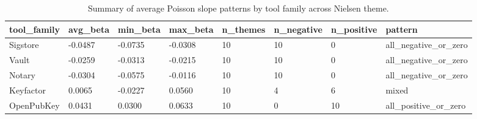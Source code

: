 \begin{table}[t]
\centering
\caption{Summary of average Poisson slope patterns by tool family across Nielsen theme.}
\label{tab:poisson-avg-beta-tool-nielsen-theme-summary}
\scriptsize
\begin{tabular}{llllllll}
\hline
tool\_family & avg\_beta & min\_beta & max\_beta & n\_themes & n\_negative & n\_positive & pattern \\
\hline
Sigstore & -0.0487 & -0.0735 & -0.0308 & 10 & 10 & 0 & all\_negative\_or\_zero \\
Vault & -0.0259 & -0.0313 & -0.0215 & 10 & 10 & 0 & all\_negative\_or\_zero \\
Notary & -0.0304 & -0.0575 & -0.0116 & 10 & 10 & 0 & all\_negative\_or\_zero \\
Keyfactor & 0.0065 & -0.0227 & 0.0560 & 10 & 4 & 6 & mixed \\
OpenPubKey & 0.0431 & 0.0300 & 0.0633 & 10 & 0 & 10 & all\_positive\_or\_zero \\
\hline
\end{tabular}
\end{table}
